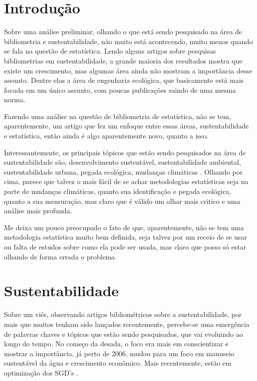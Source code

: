 \documentclass{article}[12pt]
\date{}
\author{}
\begin{document}
\section{Introdução}
Sobre uma análise preliminar, olhando o que está sendo pesquisado na área de bibliometria e
sustentabilidade, não muito está acontecendo, muito menos quando se fala na questão de estatística.
Lendo alguns artigos sobre pesquisas bibliometrias em sustentabilidade, a grande maioria dos
resultados mostra que existe um crescimento, mas algumas área ainda não mostram a importância desse
assunto. Dentre elas a área de engenharia ecológica, que basicamente está mais focada em um único
assunto, com poucas publicações saindo de uma mesma norma. \par

Fazendo uma análise na questão de bibliometria de estatística, não se tem, aparentemente, um artigo
que fez um enfoque entre essas áreas, sustentabilidade e estatística, então ainda é algo
aparentemente novo, quanto a isso. \par

Interessantemente, os principais tópicos que estão sendo pesquisados na área de sustentabilidade
são, desenvolvimento sustentável, sustentabilidade ambiental, sustentabilidade urbana, pegada
ecológica, mudanças climáticas \cite{Ellili2023}. Olhando por cima, parece que talvez o mais fácil
de se achar metodologias estatísticas seja na parte de mudanças climáticas, quanto sua
identificação e pegada ecológica, quanto a sua mensuração, mas claro que é válido um olhar mais
critico e uma análise mais profunda. \par %

Me deixa um pouco preocupado o fato de que, aparentemente, não se tem uma metodologia estatística
muito bem definida, seja talvez por um receio de se usar ou falta de estudos sobre como ela pode ser
usada, mas claro que posso só estar olhando de forma errada o problema. \par


\section{Sustentabilidade}
Sobre um viés, observando artigos bibliométricos sobre a sustentabilidade, por mais que muitos
tenham sido lançados recentemente, percebe-se uma emergência de palavras chaves e tópicos que estão
sendo pesquisados, que vai evoluindo ao longo do tempo. No começo da desada, o foco era mais em
conscientizar e mostrar a importância, já perto de 2006, mudou para um foco em manuseio sustentável
da água e crescimento econômico. Mais recentemente, estão em optimização dos SGD's \cite{Ellili2023}. \par
\end{document}
